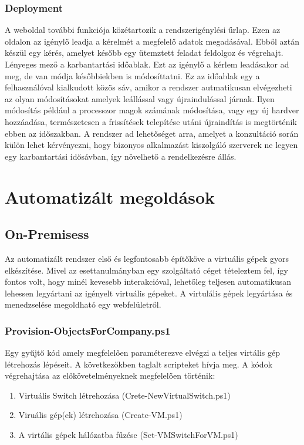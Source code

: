 \documentclass[12pt,oneside,justify,table]{book}
\begin{document}
\subsubsection{Deployment}
A weboldal további funkciója közétartozik a rendszerigénylési űrlap. Ezen az oldalon az igénylő leadja a kérelmét a megfelelő adatok megadásával. Ebből aztán készül egy kérés, amelyet később egy ütemztett feladat feldolgoz és végrehajt. Lényeges mező a karbantartási időablak. Ezt az igénylő a kérlem leadásakor ad meg, de van módja későbbiekben is módosíttatni. Ez az időablak egy a felhasználóval kialkudott közös sáv, amikor a rendszer autmatikusan elvégezheti az olyan módosításokat amelyek leállással vagy újraindulással járnak. Ilyen módosítás például a processzor magok számának módosítása, vagy egy új hardver hozzáadása, természetesen a frissítések telepítése utáni újraindítás is megtörténik ebben az időszakban. A rendszer ad lehetőséget arra, amelyet a konzultáció során külön lehet kérvényezni, hogy bizonyos alkalmazást kiszolgáló szerverek ne legyen egy karbantartási idősávban, így növelhető a rendelkezésre állás. 

\section{Automatizált megoldások}

\subsection{On-Premisess}


Az automatizált rendszer első és legfontosabb építőköve a virtuális gépek gyors elkészítése. Mivel az esettanulmányban egy szolgáltató céget tételeztem fel, így fontos volt, hogy minél kevesebb interakcióval, lehetőleg teljesen automatikusan lehessen legyártani az igényelt virtuális gépeket. A virtulális gépek legyártása és menedzselése megoldható egy webfelületről.

\subsubsection{Provision-ObjectsForCompany.ps1}
Egy gyűjtő kód amely megfelelően paraméterezve elvégzi a teljes virtális gép létrehozás lépéseit. 
A következőkben taglalt scripteket hívja meg. 
A kódok végrehajtása az előkövetelményeknek megfelelően történik:
\begin{enumerate}
	\item Virtuális Switch létrehozása (Crete-NewVirtualSwitch.ps1)
	\item Viruális gép(ek) létrehozása (Create-VM.ps1)
	\item A virtális gépek hálózatba fűzése (Set-VMSwitchForVM.ps1)
\end{enumerate}
\end{document}
